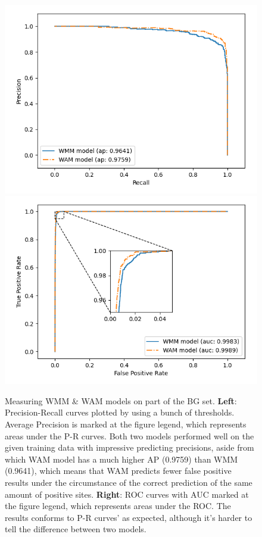 \documentclass[journal,twoside]{IEEEtran}
\begin{document}
\begin{figure}[htbp]
\centerline{\includegraphics[scale=0.58]{Pics/WMM_WAM_prcurve_donor.png}
    \includegraphics[scale=0.58]{Pics/WMM_WAM_roccurve_donor.png}}
\caption{Measuring WMM \& WAM models on part of the BG set. \textbf{Left}: Precision-Recall curves plotted by using a bunch of thresholds. Average Precision is marked at the figure legend, which represents areas under the P-R curves. Both two models performed well on the given training data with impressive predicting precisions, aside from which WAM model has a much higher AP (0.9759) than WMM (0.9641), which means that WAM predicts fewer false positive results under the circumstance of the correct prediction of the same amount of positive sites. \textbf{Right}: ROC curves with AUC marked at the figure legend, which represents areas under the ROC. The results conforms to P-R curves' as expected, although it's harder to tell the difference between two models. }
\label{fig5}
\end{figure}
\end{document}
